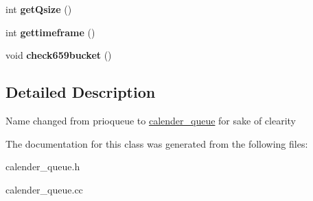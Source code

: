 \begin{DoxyCompactItemize}
\item 
\hypertarget{classcalender__queue_ac6b4b6d42278a5c88de4550d4b7f4017}{int {\bfseries get\-Qsize} ()}\label{classcalender__queue_ac6b4b6d42278a5c88de4550d4b7f4017}

\item 
\hypertarget{classcalender__queue_a3985b2b2d55245ec4b70e79e1588c608}{int {\bfseries gettimeframe} ()}\label{classcalender__queue_a3985b2b2d55245ec4b70e79e1588c608}

\item 
\hypertarget{classcalender__queue_a3b911c0f17d0cac2ff6c2a261d123a78}{void {\bfseries check659bucket} ()}\label{classcalender__queue_a3b911c0f17d0cac2ff6c2a261d123a78}

\end{DoxyCompactItemize}


\subsection{Detailed Description}
Name changed from prioqueue to \hyperlink{classcalender__queue}{calender\-\_\-queue} for sake of clearity 

The documentation for this class was generated from the following files\-:\begin{DoxyCompactItemize}
\item 
calender\-\_\-queue.\-h\item 
calender\-\_\-queue.\-cc\end{DoxyCompactItemize}
